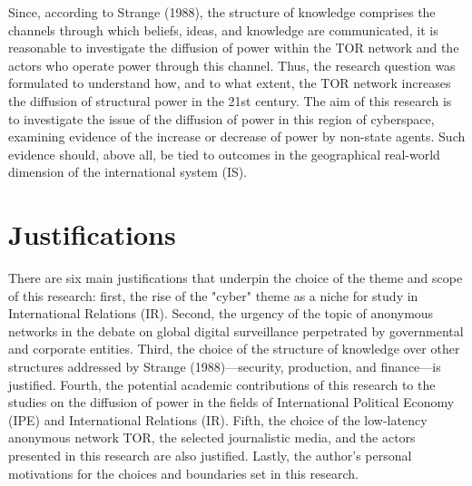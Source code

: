 Since, according to Strange (1988), the structure of knowledge comprises the channels through which beliefs, ideas, and knowledge are communicated, it is reasonable to investigate the diffusion of power within the TOR network and the actors who operate power through this channel. Thus, the research question was formulated to understand how, and to what extent, the TOR network increases the diffusion of structural power in the 21st century. The aim of this research is to investigate the issue of the diffusion of power in this region of cyberspace, examining evidence of the increase or decrease of power by non-state agents. Such evidence should, above all, be tied to outcomes in the geographical real-world dimension of the international system (IS).

\section{Justifications}

There are six main justifications that underpin the choice of the theme and scope of this research: first, the rise of the "cyber" theme as a niche for study in International Relations (IR). Second, the urgency of the topic of anonymous networks in the debate on global digital surveillance perpetrated by governmental and corporate entities. Third, the choice of the structure of knowledge over other structures addressed by Strange (1988)—security, production, and finance—is justified. Fourth, the potential academic contributions of this research to the studies on the diffusion of power in the fields of International Political Economy (IPE) and International Relations (IR). Fifth, the choice of the low-latency anonymous network TOR, the selected journalistic media, and the actors presented in this research are also justified. Lastly, the author's personal motivations for the choices and boundaries set in this research.

